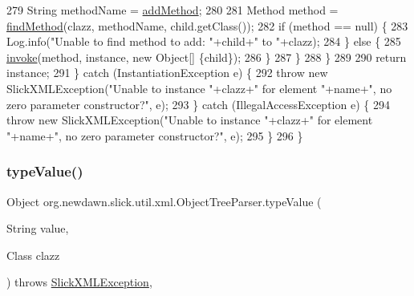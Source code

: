 \begin{DoxyCode}
279                     String methodName = \mbox{\hyperlink{classorg_1_1newdawn_1_1slick_1_1util_1_1xml_1_1_object_tree_parser_a063295dc4b123cde10949867045f71e6}{addMethod}};
280                     
281                     Method method = \mbox{\hyperlink{classorg_1_1newdawn_1_1slick_1_1util_1_1xml_1_1_object_tree_parser_adeb37b83c1082cd794c9ec1ca5da9e9f}{findMethod}}(clazz, methodName, child.getClass());
282                     \textcolor{keywordflow}{if} (method == null) \{
283                         Log.info(\textcolor{stringliteral}{"Unable to find method to add: "}+child+\textcolor{stringliteral}{" to "}+clazz);
284                     \} \textcolor{keywordflow}{else} \{
285                         \mbox{\hyperlink{classorg_1_1newdawn_1_1slick_1_1util_1_1xml_1_1_object_tree_parser_a0c4e621ec62be84ee45a12a99714aa64}{invoke}}(method, instance, \textcolor{keyword}{new} Object[] \{child\});
286                     \}
287                 \}
288             \}
289             
290             \textcolor{keywordflow}{return} instance;
291         \} \textcolor{keywordflow}{catch} (InstantiationException e) \{
292             \textcolor{keywordflow}{throw} \textcolor{keyword}{new} SlickXMLException(\textcolor{stringliteral}{"Unable to instance "}+clazz+\textcolor{stringliteral}{" for element "}+name+\textcolor{stringliteral}{", no zero
       parameter constructor?"}, e);
293         \} \textcolor{keywordflow}{catch} (IllegalAccessException e) \{
294             \textcolor{keywordflow}{throw} \textcolor{keyword}{new} SlickXMLException(\textcolor{stringliteral}{"Unable to instance "}+clazz+\textcolor{stringliteral}{" for element "}+name+\textcolor{stringliteral}{", no zero
       parameter constructor?"}, e);
295         \}
296     \}
\end{DoxyCode}
\mbox{\label{classorg_1_1newdawn_1_1slick_1_1util_1_1xml_1_1_object_tree_parser_aec7415fa8c060d9a5841c7b54a50ff27}} 
\subsubsection{\texorpdfstring{type\+Value()}{typeValue()}}
{\footnotesize\ttfamily Object org.\+newdawn.\+slick.\+util.\+xml.\+Object\+Tree\+Parser.\+type\+Value (\begin{DoxyParamCaption}\item[{String}]{value,  }\item[{Class}]{clazz }\end{DoxyParamCaption}) throws \mbox{\hyperlink{classorg_1_1newdawn_1_1slick_1_1util_1_1xml_1_1_slick_x_m_l_exception}{Slick\+X\+M\+L\+Exception}}\hspace{0.3cm}{\ttfamily [inline]}, {\ttfamily [private]}}

